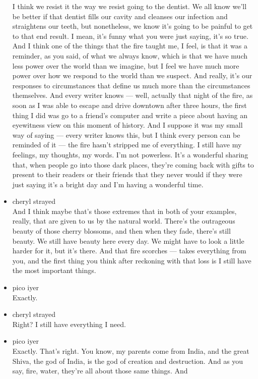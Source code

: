 \begin{itemize}
  I think we resist it the way we resist going to the dentist. We all
  know we'll be better if that dentist fills our cavity and cleanses our
  infection and straightens our teeth, but nonetheless, we know it's
  going to be painful to get to that end result. I mean, it's funny what
  you were just saying, it's so true. And I think one of the things that
  the fire taught me, I feel, is that it was a reminder, as you said, of
  what we always know, which is that we have much less power over the
  world than we imagine, but I feel we have much more power over how we
  respond to the world than we suspect. And really, it's our responses
  to circumstances that define us much more than the circumstances
  themselves. And every writer knows --- well, actually that night of
  the fire, as soon as I was able to escape and drive downtown after
  three hours, the first thing I did was go to a friend's computer and
  write a piece about having an eyewitness view on this moment of
  history. And I suppose it was my small way of saying --- every writer
  knows this, but I think every person can be reminded of it --- the
  fire hasn't stripped me of everything. I still have my feelings, my
  thoughts, my words. I'm not powerless. It's a wonderful sharing that,
  when people go into those dark places, they're coming back with gifts
  to present to their readers or their friends that they never would if
  they were just saying it's a bright day and I'm having a wonderful
  time.
\item
  cheryl strayed\\
  And I think maybe that's those extremes that in both of your examples,
  really, that are given to us by the natural world. There's the
  outrageous beauty of those cherry blossoms, and then when they fade,
  there's still beauty. We still have beauty here every day. We might
  have to look a little harder for it, but it's there. And that fire
  scorches --- takes everything from you, and the first thing you think
  after reckoning with that loss is I still have the most important
  things.
\item
  pico iyer\\
  Exactly.
\item
  cheryl strayed\\
  Right? I still have everything I need.
\item
  pico iyer\\
  Exactly. That's right. You know, my parents come from India, and the
  great Shiva, the god of India, is the god of creation and destruction.
  And as you say, fire, water, they're all about those same things. And

\end{itemize}
